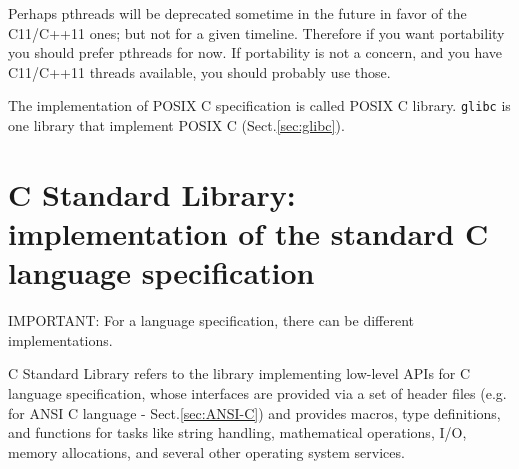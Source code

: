 Perhaps pthreads will be deprecated sometime in the future in favor of the
C11/C++11 ones; but not for a given timeline. Therefore if you want portability
you should prefer pthreads for now. If portability is not a concern, and you
have C11/C++11 threads available, you should probably use those.

The implementation of POSIX C specification is called POSIX C library.
\verb!glibc! is one library that implement POSIX C (Sect.\ref{sec:glibc}).


\section{C Standard Library: implementation of the standard C language
specification}
\label{sec:C-standard-library}


IMPORTANT: For a language specification, there can be different implementations. 

C Standard Library refers to the library implementing low-level APIs for C
language specification, whose interfaces are provided via a set of header files
(e.g. for ANSI C language - Sect.\ref{sec:ANSI-C}) and provides macros, type
definitions, and functions for tasks like string handling, mathematical
operations, I/O, memory allocations, and several other operating system
services.


